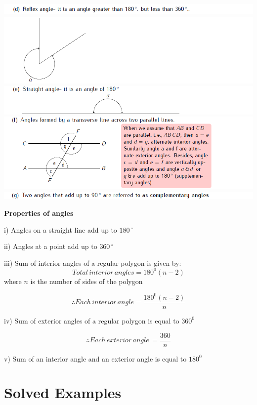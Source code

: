 \documentclass[
  a4paperpaper,
]{scrbook}
\begin{document}
\includegraphics{images/Cpt15_anglesd.png}
\includegraphics{images/Cpt15_anglesd2.png}
\includegraphics{images/Cpt15_anglese.png}
\includegraphics{images/Cpt15_anglesf.png}
\includegraphics{images/Cpt15_anglesg.png}

\textbf{Properties of angles}

i) Angles on a straight line add up to \(180\,^{\circ}\)

ii) Angles at a point add up to \(360\,^{\circ}\)

iii) Sum of interior angles of a regular polygon is given by:
\[Total \, interior \, angles
   =180^0(n-2)\] where \(n\) is the number of sides of the polygon

\[\therefore Each \,interior\, angle=\frac{180^0(n-2)}{n}\]

iv) Sum of exterior angles of a regular polygon is equal to \(360^0\)

\[\therefore Each\, exterior\, angle\,=\frac{360}{n}\]

v) Sum of an interior angle and an exterior angle is equal to \(180^0\)

\hypertarget{solved-examples-13}{%
\section{Solved Examples}\label{solved-examples-13}}
\end{document}
